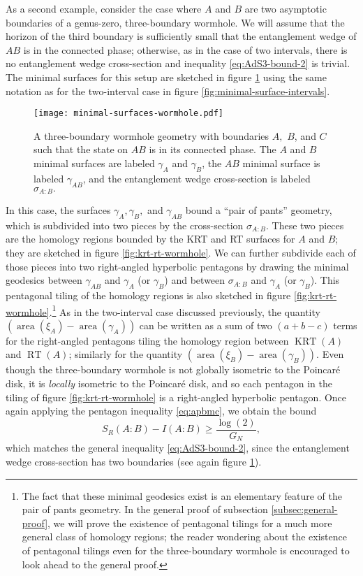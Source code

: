 \documentclass[a4paper,11pt]{article}
\newcommand{\area}{\operatorname{area}}
\newcommand{\RT}{\operatorname{RT}}
\newcommand{\KRT}{\operatorname{KRT}}
\begin{document}
As a second example, consider the case where $A$ and $B$ are two asymptotic boundaries of a genus-zero, three-boundary wormhole. We will assume that the horizon of the third boundary is sufficiently small that the entanglement wedge of $AB$ is in the connected phase; otherwise, as in the case of two intervals, there is no entanglement wedge cross-section and inequality \eqref{eq:AdS3-bound-2} is trivial. The minimal surfaces for this setup are sketched in figure \ref{fig:minimal-surfaces-wormhole} using the same notation as for the two-interval case in figure \ref{fig:minimal-surface-intervals}.

\begin{figure}
    \centering
    \texttt{[image: minimal-surfaces-wormhole.pdf]}
    \caption{A three-boundary wormhole geometry with boundaries $A,$ $B$, and $C$ such that the state on $AB$ is in its connected phase. The $A$ and $B$ minimal surfaces are labeled $\gamma_{A}$ and $\gamma_{B}$, the $AB$ minimal surface is labeled $\gamma_{AB}$, and the entanglement wedge cross-section is labeled $\sigma_{A:B}.$}
    \label{fig:minimal-surfaces-wormhole}
\end{figure}

In this case, the surfaces $\gamma_{A}, \gamma_{B},$ and $\gamma_{AB}$ bound a ``pair of pants'' geometry, which is subdivided into two pieces by the cross-section $\sigma_{A:B}$. These two pieces are the homology regions bounded by the KRT and RT surfaces for $A$ and $B$; they are sketched in figure \ref{fig:krt-rt-wormhole}. We can further subdivide each of those pieces into two right-angled hyperbolic pentagons by drawing the minimal geodesics between $\gamma_{AB}$ and $\gamma_{A}$ (or $\gamma_{B}$) and between $\sigma_{A:B}$ and $\gamma_{A}$ (or $\gamma_{B}$). This pentagonal tiling of the homology regions is also sketched in figure \ref{fig:krt-rt-wormhole}.\footnote{The fact that these minimal geodesics exist is an elementary feature of the pair of pants geometry. In the general proof of subsection \ref{subsec:general-proof}, we will prove the existence of pentagonal tilings for a much more general class of homology regions; the reader wondering about the existence of pentagonal tilings even for the three-boundary wormhole is encouraged to look ahead to the general proof.} As in the two-interval case discussed previously, the quantity $(\area(\xi_{A}) - \area(\gamma_A))$ can be written as a sum of two $(a + b - c)$ terms for the right-angled pentagons tiling the homology region between $\KRT(A)$ and $\RT(A)$; similarly for the quantity $(\area(\xi_{B}) - \area(\gamma_B)).$ Even though the three-boundary wormhole is not globally isometric to the Poincar\'{e} disk, it is \emph{locally} isometric to the Poincar\'{e} disk, and so each pentagon in the tiling of figure \ref{fig:krt-rt-wormhole} is a right-angled hyperbolic pentagon. Once again applying the pentagon inequality \eqref{eq:apbmc}, we obtain the bound
\begin{equation}
    S_R(A:B) - I(A:B)
        \geq \frac{\log(2)}{G_N},
\end{equation}
which matches the general inequality \eqref{eq:AdS3-bound-2}, since the entanglement wedge cross-section has two boundaries (see again figure \ref{fig:minimal-surfaces-wormhole}).
\end{document}
